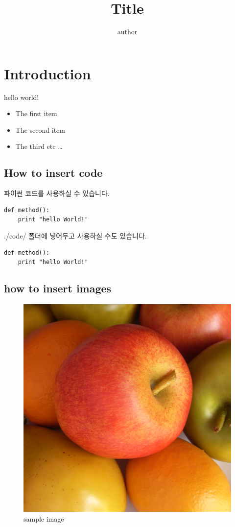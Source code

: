 

\title{Title}
\author{author}

\newtheorem{qu}{Question}



\maketitle

\section{Introduction}

hello world!

\begin{itemize}
  \item The first item
  \item The second item
  \item The third etc \ldots
\end{itemize}

\subsection{How to insert code}

파이썬 코드를
사용하실 수 있습니다.

\lstset{language=python}
\begin{lstlisting}
def method():
	print "hello World!"
\end{lstlisting}

./code/ 폴더에 넣어두고 사용하실 수도 있습니다.



\lstset{language=matlab}
\begin{lstlisting}
def method():
	print "hello World!"
\end{lstlisting}

\subsection{how to insert images}

\begin{figure}[H]
	\centering
	\includegraphics[width=0.3\linewidth]{img/sample.jpg}
	\caption{sample image}
	\label{fig:awesome_image}
\end{figure}

